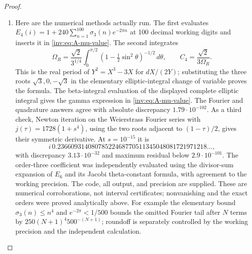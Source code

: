 \begin{proof}
\begin{enumerate}[label=\arabic*.,leftmargin=*]
\item Here are the numerical methods actually run.  The first evaluates
$E_4(i)=1+240\sum_{n=1}^{100}\sigma_3(n)e^{-2\pi n}$ at 100
decimal working digits and inserts it in \eqref{inv:eq:A-mu-value}.
The second integrates
\[
\Omega_R=\frac{\sqrt2}{3^{1/4}}
\int_0^{\pi/2}(1-\tfrac12\sin^2\theta)^{-1/2}\,d\theta,
\qquad C_4=\frac{\sqrt2}{3\Omega_R}.
\]
This is the real period of $Y^2=X^3-3X$ for $dX/(2Y)$; substituting
the three roots $\sqrt3,0,-\sqrt3$ in the elementary elliptic-integral
change of variable proves the formula.  The beta-integral evaluation
of the displayed complete elliptic integral gives the gamma
expression in \eqref{inv:eq:A-mu-value}.  The Fourier and quadrature
answers agree with absolute discrepancy $1.79\cdot10^{-102}$.
As a third check, Newton iteration on the Weierstrass Fourier series
with $j(\tau)=1728(1+s^4)$, using the two roots adjacent to
$(1-\tau)/2$, gives their symmetric derivative.  At $s=10^{-15}$ it
is
\[
i\,0.23660931408078522468770511345048081721971218\ldots,
\]
with discrepancy $3.13\cdot10^{-32}$ and maximum residual below
$2.9\cdot10^{-101}$.  The order-three coefficient was independently
evaluated using the divisor-sum expansion of $E_6$ and its Jacobi
theta-constant formula, with agreement to the working precision.
The code, all output, and precision are supplied.  These are numerical
corroborations, not interval certificates; nonvanishing and the exact
orders were proved analytically above.  For example the elementary
bound $\sigma_3(n)\le n^4$ and $e^{-2\pi}<1/500$ bounds the omitted
Fourier tail after $N$ terms by
$250(N+1)^4 500^{-(N+1)}$; roundoff is separately controlled by
the working precision and the independent calculation.
\end{enumerate}
\end{proof}

